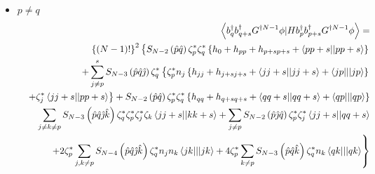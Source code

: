 \begin{itemize}
\item $p\neq q$%
\begin{eqnarray}
&&\left\langle b_{q}^{\dagger }b_{q+s}^{\dagger }G^{\dagger N-1}\phi
|Hb_{p}^{\dagger }b_{p+s}^{\dagger }G^{\dagger N-1}\phi \right\rangle = 
\nonumber \\
&&\left\{ \left( N-1\right) !\right\} ^{2}\left\{ S_{N-2}\left( \hat{p}\hat{q%
}\right) \zeta _{p}^{\ast }\zeta _{q}^{\ast }\left\{
h_{0}+h_{pp}+h_{p+sp+s}+\left\langle pp+s||pp+s\right\rangle \right\} \right.
\nonumber \\
&&+\sum_{j\neq p}^{s}S_{N-3}\left( \hat{p}\hat{q}\hat{\jmath}\right) \zeta
_{q}^{\ast }\left\{ \zeta _{p}^{\ast }n_{j}\left\{
h_{jj}+h_{j+sj+s}+\left\langle jj+s||jj+s\right\rangle +\left\langle
jp|||jp\right\rangle \right\} \right.  \nonumber \\
&&\left. +\zeta _{j}^{\ast }\left\langle jj+s||pp+s\right\rangle \right\}
+S_{N-2}\left( \hat{p}\hat{q}\right) \zeta _{p}^{\ast }\zeta _{q}^{\ast
}\left\{ h_{qq}+h_{q+sq+s}+\left\langle qq+s||qq+s\right\rangle
+\left\langle qp|||qp\right\rangle \right\}  \nonumber \\
&&\sum_{j\neq k\neq p}S_{N-3}\left( \hat{p}\hat{q}\hat{\jmath}\hat{k}\right)
\zeta _{q}^{\ast }\zeta _{p}^{\ast }\zeta _{j}^{\ast }\zeta _{k}\left\langle
jj+s||kk+s\right\rangle +\sum_{j\neq p}S_{N-2}\left( \hat{p}\hat{\jmath}\hat{%
q}\right) \zeta _{p}^{\ast }\zeta _{j}^{\ast }\left\langle
jj+s||qq+s\right\rangle  \nonumber \\
&&\left. +2\zeta _{p}^{\ast }\sum_{j,k\neq p}S_{N-4}\left( \hat{p}\hat{q}%
\hat{\jmath}\hat{k}\right) \zeta _{q}^{\ast }n_{j}n_{k}\left\langle
jk|||jk\right\rangle +4\zeta _{p}^{\ast }\sum_{k\neq p}S_{N-3}\left( \hat{p}%
\hat{q}\hat{k}\right) \zeta _{q}^{\ast }n_{k}\left\langle
qk|||qk\right\rangle \right\}
\end{eqnarray}


\end{itemize}
